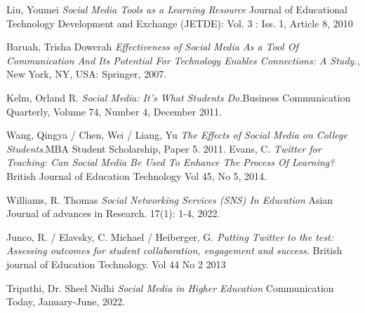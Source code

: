 \documentclass[lettersize,journal]{IEEEtran}
\begin{document}
\begin{thebibliography}{}


        Liu, Youmei {\it{Social Media Tools as a Learning Resource}} Journal of Educational Technology Development and Exchange (JETDE): Vol. 3 : Iss. 1, Article 8, 2010

    Baruah, Trisha Dowerah {\it{Effectiveness of Social Media As a Tool Of Communication And Its Potential For Technology Enables Connections: A Study.}}, New York, NY, USA: Springer, 2007.

    Kelm, Orland R. {\it{Social Media: It's What Students Do.}}Business Communication Quarterly, Volume 74, Number 4, December 2011.

        Wang, Qingya / Chen, Wei / Liang, Yu {\it{The Effects of Social Media on College Students}}.MBA Student Scholarship, Paper 5. 2011.
        Evans, C. {\it{Twitter for Teaching: Can Social Media Be Used To Enhance The Process Of Learning?}} British Journal of Education Technology
Vol 45, No 5, 2014.

        Williams, R. Thomas {\it{Social Networking Services (SNS) In Education}}
        Asian Journal of advances in Research. 17(1): 1-4, 2022.

        Junco, R. / Elavsky, C. Michael / Heiberger, G. {\it{Putting Twitter to
        the test: Assessing outcomes for student collaboration, engagement and
        success.}} British journal of Education Technology. Vol 44 No 2 2013

        Tripathi, Dr. Sheel Nidhi {\it{Social Media in Higher Education}}
        Communication Today, January-June, 2022.


\end{thebibliography}
\end{document}
